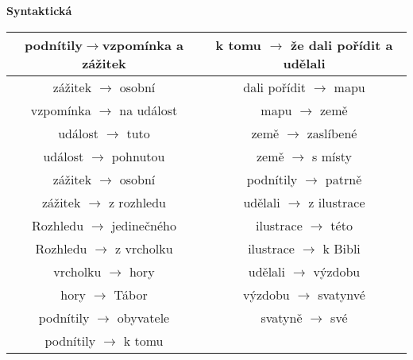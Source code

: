 \documentclass[12pt,a4paper]{article}
\theoremstyle{definition}
\begin{document}
\clearpage
\textbf{Syntaktick\'{a}} \\
\begin{tabular}{|c||c|}
\hline
podn\'{i}tily$ \rightarrow $vzpom\'{i}nka a z\'{a}\v{z}itek & k tomu $ \rightarrow $ \v{z}e dali po\v{r}\'{i}dit a ud\v{e}lali  \\
\hline
z\'{a}\v{z}itek $ \rightarrow $ osobn\'{i} & dali po\v{r}\'{i}dit  $ \rightarrow $ mapu \\
\hline
vzpom\'{i}nka $\rightarrow $ na  ud\'{a}lost &   mapu $ \rightarrow  $ zem\v{e} \\
\hline
ud\'{a}lost  $ \rightarrow $ tuto & zem\v{e} $ \rightarrow  $ zasl\'{i}ben\'{e}  \\
\hline
ud\'{a}lost  $ \rightarrow $ pohnutou & zem\v{e} $ \rightarrow  $ s m\'{i}sty  \\
\hline
z\'{a}\v{z}itek $ \rightarrow $ osobn\'{i} & podn\'{i}tily  $ \rightarrow $ patrn\v{e} \\
\hline
z\'{a}\v{z}itek   $ \rightarrow $ z rozhledu &  ud\v{e}lali $ \rightarrow $ z ilustrace\\
\hline
Rozhledu  $ \rightarrow $ jedine\v{c}n\'{e}ho  &  ilustrace $ \rightarrow $ t\'{e}to  \\
\hline
Rozhledu  $ \rightarrow $ z vrcholku &  ilustrace $ \rightarrow $ k Bibli  \\
\hline
vrcholku $ \rightarrow $ hory& ud\v{e}lali $ \rightarrow $ v\'{y}zdobu  \\
\hline
hory  $ \rightarrow $ T\'{a}bor  & v\'{y}zdobu $\rightarrow$ svatynv\'{e}  \\
\hline
podn\'{i}tily  $ \rightarrow $ obyvatele & svatyn\v{e} $\rightarrow$ sv\'{e}  \\
\hline
 podn\'{i}tily  $ \rightarrow $ k tomu & \\
 \hline
 \hline
\end{tabular} \\
\end{document}
